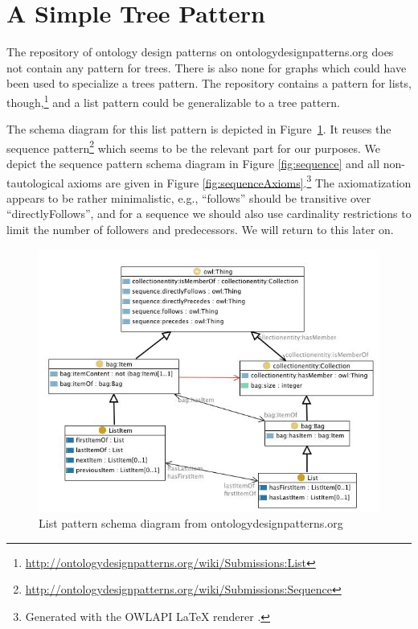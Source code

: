 \section{A Simple Tree Pattern}\label{sec:arb-trees}

The repository of ontology design patterns on ontologydesignpatterns.org does not contain any pattern for trees. There is also none for graphs which could have been used to specialize a trees pattern. The repository contains a pattern for lists, though,\footnote{\url{http://ontologydesignpatterns.org/wiki/Submissions:List}} and a list pattern could be generalizable to a tree pattern. 

The schema diagram for this list pattern is depicted in Figure~\ref{fig:list}. It reuses the sequence pattern\footnote{\url{http://ontologydesignpatterns.org/wiki/Submissions:Sequence}} which seems to be the relevant part for our purposes. We depict the sequence pattern schema diagram in Figure \ref{fig:sequence} and all non-tautological axioms are given in Figure \ref{fig:sequenceAxioms}.\footnote{Generated with the OWLAPI \LaTeX{} renderer \cite{eswc17-latex}.} The axiomatization appears to be rather minimalistic, e.g., ``follows'' should be transitive over ``directlyFollows'', and for a sequence we should also use cardinality restrictions to limit the number of followers and predecessors. We will return to this later on.

\begin{figure}[t]
\begin{center}
\includegraphics[width=\textwidth]{list.jpg}
\end{center}
\caption{List pattern schema diagram from ontologydesignpatterns.org}\label{fig:list}
\end{figure}

